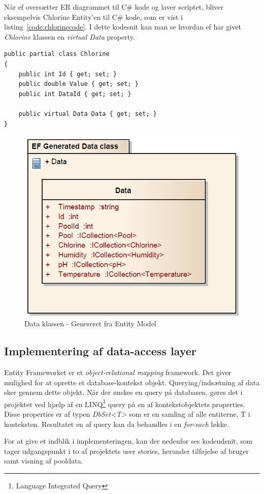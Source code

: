 Når \gls{ef} oversætter ER diagrammet til C\# kode og laver scriptet, bliver eksempelvis Chlorine Entity'en til C\# kode, som er vist i listing~\ref{code:chlorinecode}. I dette kodesnit kan man se hvordan \gls{ef} har givet \textit{Chlorine} klassen en \textit{virtual Data} property.

\begin{minipage}[h]{\linewidth}
\begin{lstlisting}[caption=C\# kode repræsentationen af Chlorine entity.,label=code:chlorinecode]
public partial class Chlorine
{
	public int Id { get; set; }
	public double Value { get; set; }
	public int DataId { get; set; }
	
	public virtual Data Data { get; set; }
}
\end{lstlisting}
\end{minipage}

\begin{figure}
	\centering
	\includegraphics[width=0.5\linewidth]{figs/implementering/efGeneratedData.PNG}
	\caption{Data klassen - Genereret fra Entity Model}
	\label{fig:efGeneratedData}
\end{figure}

\subsection{Implementering af data-access layer}

Entity Frameworket er et \textit{object-relational mapping} framework. Det giver mulighed for at oprette et database-kontekst objekt. Querying/indsætning af data sker gennem dette objekt. Når der ønskes en query på databasen, gøres det i projektet ved hjælp af en LINQ\footnote{Language Integrated Query} query på en af kontekstobjektets properties. Disse properties er af typen \textit{DbSet<T>} som er en samling af alle entiterne, T i konteksten. Resultatet en af query kan da behandles i en \textit{for-each} løkke.

For at give et indblik i implementeringen, kan der nedenfor ses kodeudsnit, som tager udgangspunkt i to af projektets user stories, herunder tilføjelse af bruger samt visning af pooldata.

